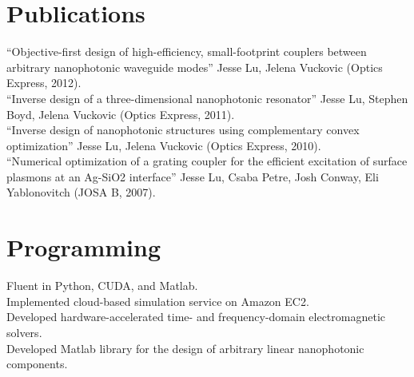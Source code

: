 \documentclass{res}
\begin{document}
\begin{resume}
\section{Publications}          
    ``Objective-first design of high-efficiency, small-footprint couplers between arbitrary nanophotonic waveguide modes'' Jesse Lu, Jelena Vuckovic (Optics Express, 2012). \\
    ``Inverse design of a three-dimensional nanophotonic resonator'' Jesse Lu, Stephen Boyd, Jelena Vuckovic (Optics Express, 2011). \\
    ``Inverse design of nanophotonic structures using complementary convex optimization'' Jesse Lu, Jelena Vuckovic (Optics Express, 2010). \\
    ``Numerical optimization of a grating coupler for the efficient excitation of surface plasmons at an Ag-SiO2 interface'' Jesse Lu, Csaba Petre, Josh Conway, Eli Yablonovitch (JOSA B, 2007).
  
\section{Programming}          
    Fluent in Python, CUDA, and Matlab. \\
    Implemented cloud-based simulation service on Amazon EC2. \\
    Developed hardware-accelerated time- and frequency-domain
        electromagnetic solvers. \\
    Developed Matlab library for the design of arbitrary linear nanophotonic components.


\end{resume}
\end{document}
